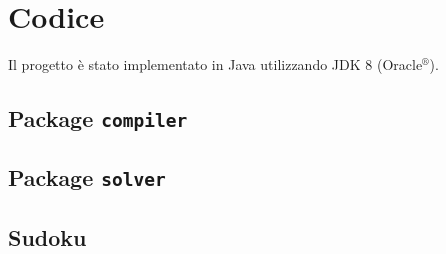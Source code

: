 \section{Codice}

Il progetto è stato implementato in Java\texttrademark{} utilizzando JDK 8 (Oracle$^{\text{®}}$).

\subsection{Package {\tt compiler}}






\subsection{Package {\tt solver}}









\subsection{Sudoku}


